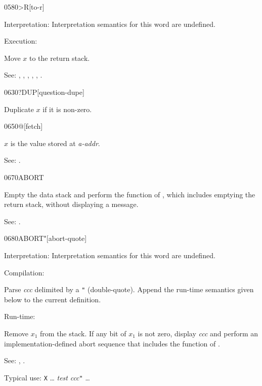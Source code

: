 \begin{newword*}[toR]{0580}{>R}[to-r]
\item[Interpretation:]
	Interpretation semantics for this word are undefined.

\item[Execution:]

	Move $x$ to the return stack.

\item[See:]
	,
	,
	,
	,
	,
	.
\end{newword*}


\begin{newword}{0630}{?DUP}[question-dupe]

	Duplicate $x$ if it is non-zero.
\end{newword}


\begin{newword}{0650}{@}[fetch]

	$x$ is the value stored at \emph{a-addr}.

\item[See:]
	.
\end{newword}


\begin{newword}{0670}{ABORT}

	Empty the data stack and perform the function of ,
	which includes emptying the return stack, without displaying
	a message.

\item[See:]
	.
\end{newword}


\begin{newword*}[ABORTq]{0680}{ABORT"}[abort-quote]
\item[Interpretation:]
	Interpretation semantics for this word are undefined.
\item[Compilation:]

	Parse \emph{ccc} delimited by a \texttt{"} (double-quote).
	Append the run-time semantics given below to the current
	definition.

\item[Run-time:]

	Remove $x_1$ from the stack. If any bit of $x_1$ is not zero,
	display \emph{ccc} and perform an implementation-defined abort
	sequence that includes the function of .

\item[See:]
	,
	.

	\begin{rationale} %
		Typical use:
			\word{:} \texttt{X} {\ldots}
				\emph{test}  \emph{ccc}\texttt{"}
			{\ldots} \word{;}
	\end{rationale}
\end{newword*}



